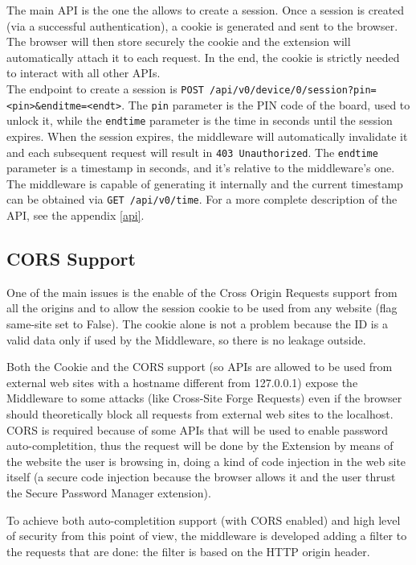 The main API is the one the allows to create a session. Once a session is created (via a successful authentication), a cookie is generated and sent to the browser. The browser will then store securely the cookie and the extension will automatically attach it to each request. In the end, the cookie is strictly needed to interact with all other APIs.\\

The endpoint to create a session is \texttt{POST /api/v0/device/0/session?pin=<pin>\&enditme=<endt>}. The \texttt{pin} parameter is the PIN code of the board, used to unlock it, while the \texttt{endtime} parameter is the time in seconds until the session expires. When the session expires, the middleware will automatically invalidate it and each subsequent request will result in \texttt{403 Unauthorized}. The \texttt{endtime} parameter is a timestamp in seconds, and it's relative to the middleware's one. The middleware is capable of generating it internally and the current timestamp can be obtained via \texttt{GET /api/v0/time}. For a more complete description of the API, see the appendix \ref{api}.

\subsection{CORS Support}
One of the main issues is the enable of the Cross Origin Requests support from all the origins and to allow the session cookie to be used from any website (flag same-site set to False). The cookie alone is not a problem because the ID is a valid data only if used by the Middleware, so there is no leakage outside. \bigskip

Both the Cookie and the CORS support (so APIs are allowed to be used from external web sites with a hostname different from 127.0.0.1) expose the Middleware to some attacks (like Cross-Site Forge Requests) even if the browser should theoretically block all requests from external web sites to the localhost. CORS is required because of some APIs that will be used to enable password auto-completition, thus the request will be done by the Extension by means of the website the user is browsing in, doing a kind of code injection in the web site itself (a secure code injection because the browser allows it and the user thrust the Secure Password Manager extension). \bigskip

To achieve both auto-completition support (with CORS enabled) and high level of security from this point of view, the middleware is developed adding a filter to the requests that are done: the filter is based on the HTTP origin header. \bigskip

